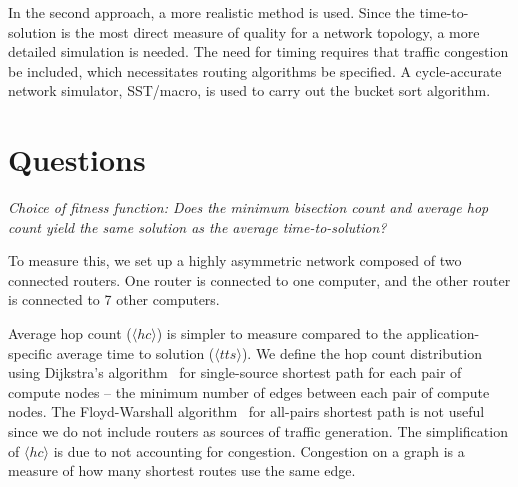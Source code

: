 \documentclass[pdftex]{article}
\begin{document}
In the second approach, a more realistic method is used. 
Since the time-to-solution is the most direct measure of quality for a network topology, a more detailed simulation is needed. The need for timing requires that traffic congestion be included, which necessitates routing algorithms be specified. A cycle-accurate network simulator, SST/macro, is used to carry out the bucket sort algorithm. 



\section{Questions}

\textit{Choice of fitness function: Does the minimum bisection count and average hop count yield the same solution as the average time-to-solution?}

To measure this, we set up a highly asymmetric network composed of two connected routers. One router is connected to one computer, and the other router is connected to 7 other computers. 

Average hop count ($\langle hc \rangle$) is simpler to measure compared to the application-specific average time to solution ($\langle tts \rangle$). We define the hop count distribution using Dijkstra's algorithm~\cite{1959_Dijkstra} for single-source shortest path for each pair of compute nodes -- the minimum number of edges between each pair of compute nodes.  The Floyd-Warshall algorithm~\cite{1962_Floyd} for all-pairs shortest path is not useful since we do not include routers as sources of traffic generation. The simplification of $\langle hc \rangle$ is due to not accounting for congestion. Congestion on a graph is a measure of how many shortest routes use the same edge.
\end{document}
